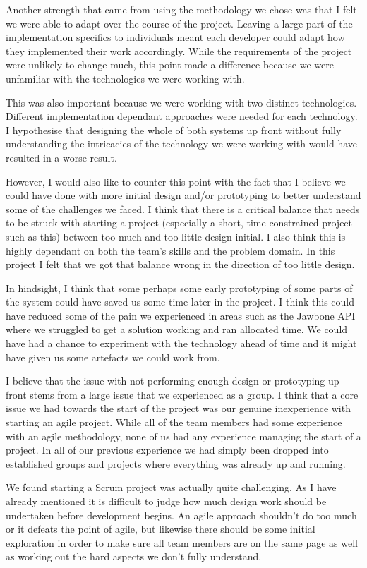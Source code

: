 \documentclass[paper=a4, fontsize=11pt]{scrartcl}	%
\numberwithin{equation}{section}															%
\numberwithin{figure}{section}																%
\numberwithin{table}{section}
\begin{document}
Another strength that came from using the methodology we chose was that I felt we were able to adapt over the course of the project. Leaving a large part of the implementation specifics to individuals meant each developer could adapt how they implemented their work accordingly. While the requirements of the project were unlikely to change much, this point made a difference because we were unfamiliar with the technologies we were working with. 

This was also important because we were working with two distinct technologies. Different implementation dependant approaches were needed for each technology. I hypothesise that designing the whole of both systems up front without fully understanding the intricacies of the technology we were working with would have resulted in a worse result.

However, I would also like to counter this point with the fact that I believe we could have done with more initial design and/or prototyping to better understand some of the challenges we faced. I think that there is a critical balance that needs to be struck with starting a project (especially a short, time constrained project such as this) between too much and too little design initial. I also think this is highly dependant on both the team's skills and the problem domain. In this project I felt that we got that balance wrong in the direction of too little design.

In hindsight, I think that some perhaps some early prototyping of some parts of the system could have saved us some time later in the project. I think this could have reduced some of the pain we experienced in areas such as the Jawbone API where we struggled to get a solution working and ran allocated time. We could have had a chance to experiment with the technology ahead of time and it might have given us some artefacts we could work from. 

I believe that the issue with not performing enough design or prototyping up front stems from a large issue that we experienced as a group. I think that a core issue we had towards the start of the project was our genuine inexperience with starting an agile project. While all of the team members had some experience with an agile methodology, none of us had any experience managing the start of a project. In all of our previous experience we had simply been dropped into established groups and projects where everything was already up and running. 

We found starting a Scrum project was actually quite challenging. As I have already mentioned it is difficult to judge how much design work should be undertaken before development begins. An agile approach shouldn't do too much or it defeats the point of agile, but likewise there should be some initial exploration in order to make sure all team members are on the same page as well as working out the hard aspects we don't fully understand. 
\end{document}
